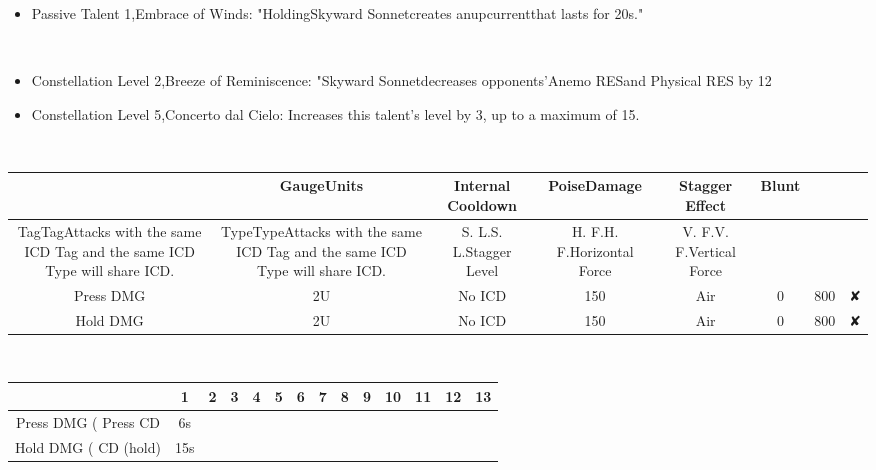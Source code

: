 \documentclass[a4paper,12pt]{article}
\begin{document}
\begin{itemize}
\item Passive Talent 1,Embrace of Winds: "HoldingSkyward Sonnetcreates anupcurrentthat lasts for 20s."
\end{itemize}\\ \par \vspace{0.5cm}

\begin{itemize}
\item Constellation Level 2,Breeze of Reminiscence: "Skyward Sonnetdecreases opponents'Anemo RESand Physical RES by 12%
\item Constellation Level 5,Concerto dal Cielo: Increases this talent's level by 3, up to a maximum of 15.
\end{itemize}\\ \par \vspace{0.5cm}

\begin{tabular}{|c|c|c|c|c|c|} \hline
 & GaugeUnits & Internal Cooldown & PoiseDamage & Stagger Effect & Blunt \\
 \hline
TagTagAttacks with the same ICD Tag and the same ICD Type will share ICD. & TypeTypeAttacks with the same ICD Tag and the same ICD Type will share ICD. & S. L.S. L.Stagger Level & H. F.H. F.Horizontal Force & V. F.V. F.Vertical Force \\
Press DMG & 2U & No ICD & 150 & Air & 0 & 800 & ✘ \\
Hold DMG & 2U & No ICD & 150 & Air & 0 & 800 & ✘ \\
\end{tabular}\\ \par \vspace{0.5cm}

\begin{tabular}{|c|c|c|c|c|c|c|c|c|c|c|c|c|c|} \hline
 & 1 & 2 & 3 & 4 & 5 & 6 & 7 & 8 & 9 & 10 & 11 & 12 & 13 \\
 \hline
Press DMG (%
Press CD & 6s \\
Hold DMG (%
CD (hold) & 15s \\
\end{tabular}\\ \par \vspace{0.5cm}
\end{document}
